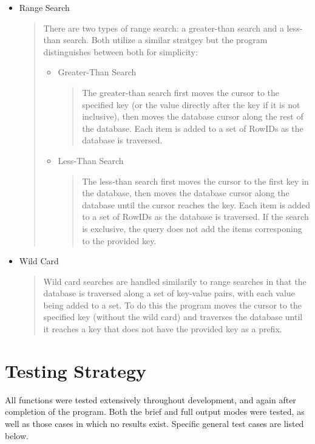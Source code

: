 \documentclass[11pt, a4paper]{article}
\begin{document}
{\begin{itemize}
\item Range Search
	\begin{quotation}
	\noindent There are two types of range search: a greater-than search and a less-than search. Both utilize a similar stratgey but the program distinguishes between both for simplicity:
	\begin{itemize}
		\item Greater-Than Search
		\begin{quotation}
		\noindent The greater-than search first moves the cursor to the specified key (or the value directly after the key if it is not inclusive), then moves the database cursor along the rest of the database. Each item is added to a set of RowIDs as the database is traversed.
		\end{quotation}
		\item Less-Than Search
		\begin{quotation}
		\noindent The less-than search first moves the cursor to the first key in the database, then moves the database cursor along the database until the cursor reaches the key. Each item is added to a set of RowIDs as the database is traversed. If the search is exclusive, the query does not add the items corresponing to the provided key.
		\end{quotation}
	\end{itemize}
	\end{quotation}

\item Wild Card
	\begin{quotation}
	\noindent Wild card searches are handled similarily to range searches in that the database is traversed along a set of key-value pairs, with each value being added to a set. To do this the program moves the cursor to the specified key (without the wild card) and traverses the database until it reaches a key that does not have the provided key as a prefix. 
	\end{quotation}	
\end{itemize}


\section{Testing Strategy}\label{TS}
All functions were tested extensively throughout development, and again after completion of the program. Both the brief and full output modes were tested, as well as those cases in which no results exist. Specific general test cases are listed below.
\begin{itemize}


\end{itemize}}
\end{document}
